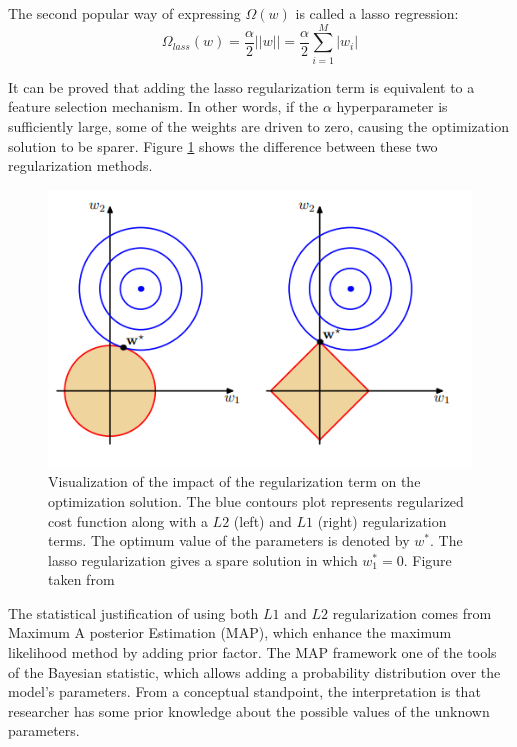The second popular way of expressing $\Omega(w)$ is called a lasso regression:
\begin{equation}
    \Omega_{lass}(w) = \frac{\alpha}{2} ||w|| = \frac{\alpha}{2} \sum_{i=1}^{M} |w_i|
\end{equation}

It can be proved that adding the lasso regularization term is equivalent to a feature selection mechanism. In other words, if the $\alpha$ hyperparameter is sufficiently large, some of the weights are driven to zero, causing the optimization solution to be sparer. Figure \ref{fig:L1vsL2} shows the difference between these two regularization methods.  



\begin{figure}[!h]
\centering
\includegraphics{figures/L1vsL2.PNG}
\caption{Visualization of the impact of the regularization term on the optimization solution. The blue contours plot represents regularized cost function along with a $L2$ (left) and $L1$ (right) regularization terms. The optimum value of the parameters is denoted by $w^{*}$. The lasso regularization gives a spare solution in which $w_{1}^*=0$. Figure taken from \cite{bishop}  
\label{fig:L1vsL2}}
\end{figure}

The statistical justification of using both $L1$ and $L2$ regularization comes from Maximum A posterior Estimation (MAP), which enhance the maximum likelihood method by adding prior factor. The MAP framework one of the tools of the Bayesian statistic, which allows adding a probability distribution over the model's parameters. From a conceptual standpoint, the interpretation is that researcher has some prior knowledge about the possible values of the unknown parameters.


